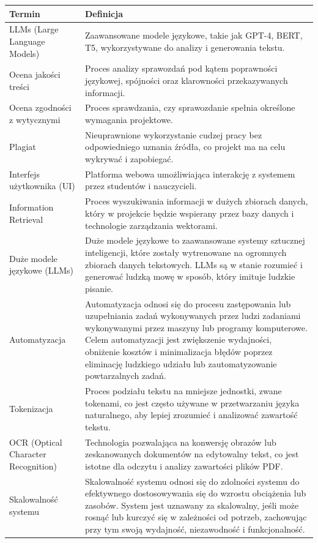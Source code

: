 \documentclass[a4paper, 12pt]{article}
\begin{document}
\begin{center}
\footnotesize
\begin{tabular}{|p{}|p{}|}
\hline
\textbf{Termin} & \textbf{Definicja} \\
\hline
LLMs (Large Language Models) & Zaawansowane modele językowe, takie jak GPT-4, BERT, T5, wykorzystywane do analizy i generowania tekstu. \\
\hline
Ocena jakości treści & Proces analizy sprawozdań pod kątem poprawności językowej, spójności oraz klarowności przekazywanych informacji. \\
\hline
Ocena zgodności z wytycznymi & Proces sprawdzania, czy sprawozdanie spełnia określone wymagania projektowe. \\
\hline
Plagiat & Nieuprawnione wykorzystanie cudzej pracy bez odpowiedniego uznania źródła, co projekt ma na celu wykrywać i zapobiegać. \\
\hline
Interfejs użytkownika (UI) & Platforma webowa umożliwiająca interakcję z systemem przez studentów i nauczycieli. \\
\hline
Information Retrieval & Proces wyszukiwania informacji w dużych zbiorach danych, który w projekcie będzie wspierany przez bazy danych i technologie zarządzania wektorami. \\
\hline
Duże modele językowe (LLMs) & Duże modele językowe to zaawansowane systemy sztucznej inteligencji, które zostały wytrenowane na ogromnych zbiorach danych tekstowych. LLMs są w stanie rozumieć i generować ludzką mowę w sposób, który imituje ludzkie pisanie. \\
\hline
Automatyzacja & Automatyzacja odnosi się do procesu zastępowania lub uzupełniania zadań wykonywanych przez ludzi zadaniami wykonywanymi przez maszyny lub programy komputerowe. Celem automatyzacji jest zwiększenie wydajności, obniżenie kosztów i minimalizacja błędów poprzez eliminację ludzkiego udziału lub zautomatyzowanie powtarzalnych zadań. \\
\hline
Tokenizacja & Proces podziału tekstu na mniejsze jednostki, zwane tokenami, co jest często używane w przetwarzaniu języka naturalnego, aby lepiej zrozumieć i analizować zawartość tekstu. \\
\hline
OCR (Optical Character Recognition) & Technologia pozwalająca na konwersję obrazów lub zeskanowanych dokumentów na edytowalny tekst, co jest istotne dla odczytu i analizy zawartości plików PDF. \\
\hline
Skalowalność systemu & Skalowalność systemu odnosi się do zdolności systemu do efektywnego dostosowywania się do wzrostu obciążenia lub zasobów. System jest uznawany za skalowalny, jeśli może rosnąć lub kurczyć się w zależności od potrzeb, zachowując przy tym swoją wydajność, niezawodność i funkcjonalność. \\

\end{tabular}
\end{center}
\end{document}
